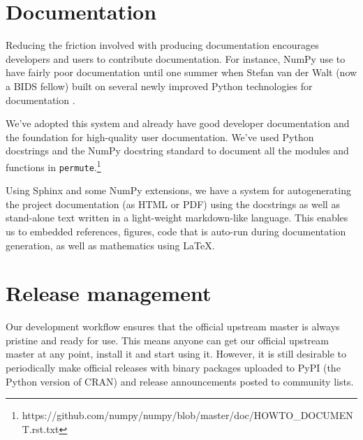 %
%
%
%
%
%

\section{\label{sec:doc}Documentation}

Reducing the
friction involved with producing documentation encourages developers and users
to contribute documentation.  For instance, NumPy use to have fairly poor
documentation until one summer when Stefan van der Walt (now a BIDS fellow)
built on several newly improved Python technologies for documentation
\cite{SciPyProceedings_27}.

We've adopted this system and already have good developer documentation and the
foundation for high-quality user documentation. We've used Python docstrings and
the NumPy docstring standard to document all the modules and functions in
\texttt{permute}.\footnote{https://github.com/numpy/numpy/blob/master/doc/HOWTO\_DOCUMENT.rst.txt}

Using Sphinx and some NumPy extensions, we have a system for autogenerating the
project documentation (as HTML or PDF) using the docstrings as well as
stand-alone text written in a light-weight markdown-like language.  This
enables us to embedded references, figures, code that is auto-run during
documentation generation, as well as mathematics using \LaTeX.

\section{\label{sec:release}Release management}

Our development workflow ensures that the official upstream master is always
pristine and ready for use.  This means anyone can get our official upstream
master at any point, install it and start using it.  However, it is still
desirable to periodically make official releases with binary packages uploaded
to PyPI (the Python version of CRAN) and release announcements posted to
community lists.

